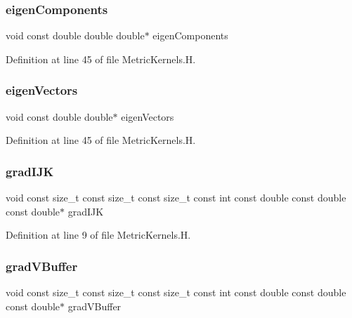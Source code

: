 \subsubsection{\texorpdfstring{eigen\+Components}{eigenComponents}}
{\footnotesize\ttfamily void const double double double$\ast$ eigen\+Components}



Definition at line 45 of file Metric\+Kernels.\+H.

\hypertarget{MetricKernels_8H_afb43d750e3a6b4c1549a9589c0f2a7d6}{}\label{MetricKernels_8H_afb43d750e3a6b4c1549a9589c0f2a7d6} 
\subsubsection{\texorpdfstring{eigen\+Vectors}{eigenVectors}}
{\footnotesize\ttfamily void const double double$\ast$ eigen\+Vectors}



Definition at line 45 of file Metric\+Kernels.\+H.

\hypertarget{MetricKernels_8H_ad58f505f7d2d54962e14d93a8b3a2104}{}\label{MetricKernels_8H_ad58f505f7d2d54962e14d93a8b3a2104} 
\subsubsection{\texorpdfstring{grad\+I\+JK}{gradIJK}}
{\footnotesize\ttfamily void const size\+\_\+t const size\+\_\+t const size\+\_\+t const int const double const double const double$\ast$ grad\+I\+JK}



Definition at line 9 of file Metric\+Kernels.\+H.

\hypertarget{MetricKernels_8H_a2b1827ebabaeeb58a5d4c7a8fe729bca}{}\label{MetricKernels_8H_a2b1827ebabaeeb58a5d4c7a8fe729bca} 
\subsubsection{\texorpdfstring{grad\+V\+Buffer}{gradVBuffer}}
{\footnotesize\ttfamily void const size\+\_\+t const size\+\_\+t const size\+\_\+t const int const double const double const double$\ast$ grad\+V\+Buffer}



